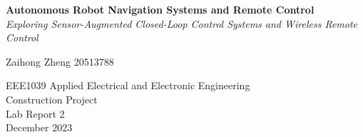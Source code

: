 
\begin{titlepage}
  \begin{center}
    \vspace*{4cm}
    \LARGE{\textbf{Autonomous Robot Navigation Systems and Remote Control}} \\
    \small{\textit{Exploring Sensor-Augmented Closed-Loop Control Systems and Wireless Remote Control}}

    \vspace*{7cm} %

    \large{Zaihong Zheng 20513788}

    \vspace*{1cm}

    \large{EEE1039 Applied Electrical and Electronic Engineering\\ Construction Project} \\

    \vspace*{1cm}
    \large{Lab Report 2} \\
    \large{December 2023} \\
  \end{center}
\end{titlepage}

\restoregeometry %

